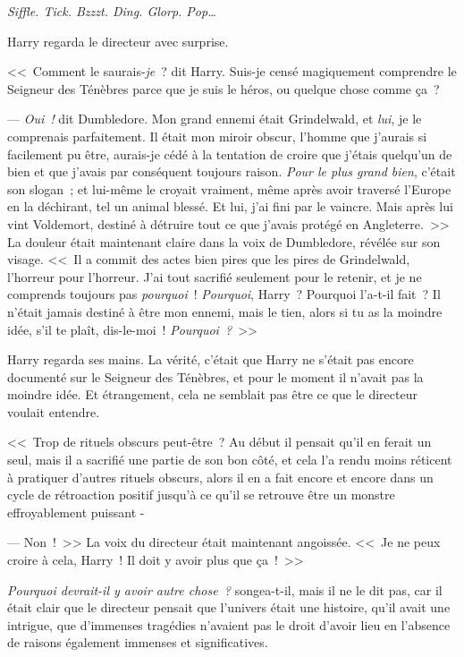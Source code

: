 \later

\emph{Siffle. Tick. Bzzzt. Ding. Glorp. Pop…}

Harry regarda le directeur avec surprise.

<<~Comment le saurais-\emph{je}~? dit Harry. Suis-je censé magiquement comprendre le Seigneur des Ténèbres parce que je suis le héros, ou quelque chose comme ça~?

--- \emph{Oui~!} dit Dumbledore. Mon grand ennemi était Grindelwald, et \emph{lui}, je le comprenais parfaitement. Il était mon miroir obscur, l'homme que j'aurais si facilement pu être, aurais-je cédé à la tentation de croire que j'étais quelqu'un de bien et que j'avais par conséquent toujours raison. \emph{Pour le plus grand bien}, c'était son slogan~; et lui-même le croyait vraiment, même après avoir traversé l'Europe en la déchirant, tel un animal blessé. Et lui, j'ai fini par le vaincre. Mais après lui vint Voldemort, destiné à détruire tout ce que j'avais protégé en Angleterre.~>> La douleur était maintenant claire dans la voix de Dumbledore, révélée sur son visage. <<~Il a commit des actes bien pires que les pires de Grindelwald, l'horreur pour l'horreur. J'ai tout sacrifié seulement pour le retenir, et je ne comprends toujours pas \emph{pourquoi}~! \emph{Pourquoi}, Harry~? Pourquoi l'a-t-il fait~? Il n'était jamais destiné à être mon ennemi, mais le tien, alors si tu as la moindre idée, s'il te plaît, dis-le-moi~! \emph{Pourquoi~?}~>>

Harry regarda ses mains. La vérité, c'était que Harry ne s'était pas encore documenté sur le Seigneur des Ténèbres, et pour le moment il n'avait pas la moindre idée. Et étrangement, cela ne semblait pas être ce que le directeur voulait entendre.

<<~Trop de rituels obscurs peut-être~? Au début il pensait qu'il en ferait un seul, mais il a sacrifié une partie de son bon côté, et cela l'a rendu moins réticent à pratiquer d'autres rituels obscurs, alors il en a fait encore et encore dans un cycle de rétroaction positif jusqu'à ce qu'il se retrouve être un monstre effroyablement puissant -

--- Non~!~>> La voix du directeur était maintenant angoissée. <<~Je ne peux croire à cela, Harry~! Il doit y avoir plus que ça~!~>>

\emph{Pourquoi devrait-il y avoir autre chose~?} songea-t-il, mais il ne le dit pas, car il était clair que le directeur pensait que l'univers était une histoire, qu'il avait une intrigue, que d'immenses tragédies n'avaient pas le droit d'avoir lieu en l'absence de raisons également immenses et significatives.


